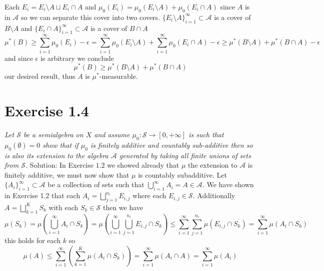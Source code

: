 \documentclass[11pt]{article}
\newcommand{\solution}[1]{{{\textcolor{header}{Solution:} \textcolor{solution}{#1}}}}
\begin{document}
{\[    \] 
    Each $E_i = E_i \setminus A \sqcup E_i \cap A$ and  $\mu_0(E_i) = \mu_0(E_i \setminus A) + \mu_0(E_i \cap A)$ since $A$ is in $ \mathcal{A}$ so we can separate this cover into two covers.
    $\{E_i \setminus A\}_{i=1}^{\infty} \subset \mathcal{A}$ is a cover of $B \setminus A$ and  $\{E_i \cap A\}_{i=1}^{\infty} \subset \mathcal{A}$ 
    is a cover of $B \cap A$
    \[
    \mu^{*}(B) \ge \sum_{i=1}^{\infty}\mu_0(E_i) -\epsilon = \sum_{i=1}^{\infty}\mu_0(E_i \setminus A) + \sum_{i=1}^{\infty}\mu_0(E_i \cap A) - \epsilon \ge \mu^{*}(B \setminus A) + \mu^{*}(B \cap A) - \epsilon
    \] 
    and since $\epsilon$ is arbitrary we conclude
    \[
    \mu^{*}(B) \ge \mu^{*}(B \setminus A) + \mu^{*}(B \cap A)
    \] 
    our desired result, thus $A$ is $\mu^{*}$-measurable.
}

\section{Exercise 1.4}
\emph{
    Let $\mathcal{S}$ be a semialgebra on  $X$ and assume  $\mu_0: \mathcal{S} \rightarrow [0,+\infty]$ is such that
    $\mu_0(\emptyset) = 0$ show that if $\mu_0$ is finitely additive and countably sub-additive then so is also its extension
    to the algebra $ \mathcal{A}$ generated by taking all finite unions of sets from $\mathcal{S}$.
}
\solution{
    In Exercise $1.2$ we showed already that  $\mu$ the extension to $ \mathcal{A}$ is finitely additive, we must now show that
    $\mu$ is countably subadditive. Let $\{A_i\}_{i=1}^{\infty} \subset \mathcal{A}$ be a collection of sets such that $\bigcup_{i=1}^{\infty}A_i = A \in \mathcal{A}$. We have shown
    in Exercise 1.2 that each $A_i = \bigsqcup_{j=1}^{n_i}E_{i,j}$ where each $E_{i,j} \in \mathcal{S}$. Additionally $A = \bigsqcup_{k=1}^{K}S_k$ with each $S_k \in \mathcal{S}$ then we have
    \[
        \mu(S_k) = \mu(\bigcup_{i=1}^{\infty} A_i \cap S_k) = \mu(\bigcup_{i=1}^{\infty}\bigcup_{j=1}^{n_i}E_{i,j} \cap S_k) \le \sum_{i=1}^{\infty}\sum_{j=1}^{n_i}\mu(E_{i,j} \cap S_k) = \sum_{i=1}^{\infty}\mu(A_i \cap S_k)
    \] 
    this holds for each $k$ so
    \[
    \mu(A) \le \sum_{i=1}^{\infty}(\sum_{k=1}^{K}\mu(A_i \cap S_k)) = \sum_{i=1}^{\infty}\mu(A_i \cap A) = \sum_{i=1}^{\infty}\mu(A_i)
    \] 
}
\end{document}
